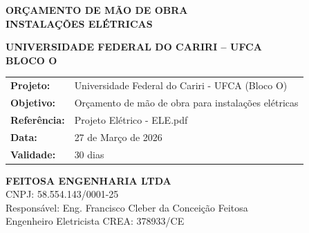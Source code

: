 \documentclass[12pt,a4paper]{article}
\renewenvironment{table}%
{\begin{center}%
\scriptsize%
\addtolength{\tabcolsep}{-2pt}%
}%
{\end{center}}
\begin{document}
\begin{titlepage}
\thispagestyle{empty}

\vspace*{2cm}
\begin{center}
\Large\textbf{\color{gray900}\uppercase{Orçamento de Mão de Obra}}\\[0.5cm]
\Large\textbf{\color{gray900}\uppercase{Instalações Elétricas}}\\[1cm]

\vspace{2cm}

\Large\textbf{\color{gray700}\uppercase{Universidade Federal do Cariri -- UFCA}}\\[0.5cm]
\Large\textbf{\color{gray700}\uppercase{Bloco O}}

\vspace{3cm}

\begin{table}
\centering
\large
\begin{tabular}{p{3cm}p{8cm}}
\textbf{Projeto:} & Universidade Federal do Cariri - UFCA (Bloco O) \\
\textbf{Objetivo:} & Orçamento de mão de obra para instalações elétricas \\
\textbf{Referência:} & Projeto Elétrico - ELE.pdf \\
\textbf{Data:} & 27 de Março de 2026 \\
\textbf{Validade:} & 30 dias
\end{tabular}
\end{table}

\vfill

\begin{flushright}
\textbf{FEITOSA ENGENHARIA LTDA} \\
CNPJ: 58.554.143/0001-25 \\
Responsável: Eng. Francisco Cleber da Conceição Feitosa \\
Engenheiro Eletricista CREA: 378933/CE
\end{flushright}

\vspace{2cm}
\end{center}
\end{titlepage}
\pagebreak

\end{document}
